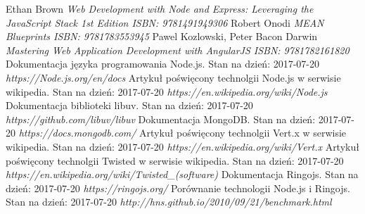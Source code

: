 \documentclass[12pt]{report}
\begin{document}
\begin{thebibliography}{99}
Ethan Brown
\textit{Web Development with Node and Express: Leveraging the JavaScript Stack 1st Edition ISBN: 9781491949306}
Robert Onodi
\textit{MEAN Blueprints ISBN: 9781783553945}
Pawel Kozlowski, Peter Bacon Darwin
\textit{Mastering Web Application Development with AngularJS ISBN: 9781782161820}
Dokumentacja języka programowania Node.js. Stan na dzień: 2017-07-20
\textit{https://Node.js.org/en/docs}
Artykuł poświęcony technolgii Node.js w serwisie wikipedia. Stan na dzień: 2017-07-20
\textit{https://en.wikipedia.org/wiki/Node.js}
Dokumentacja biblioteki libuv. Stan na dzień: 2017-07-20
\textit{https://github.com/libuv/libuv}
Dokumentacja MongoDB. Stan na dzień: 2017-07-20
\textit{https://docs.mongodb.com/}
Artykuł poświęcony technolgii Vert.x w serwisie wikipedia. Stan na dzień: 2017-07-20
\textit{https://en.wikipedia.org/wiki/Vert.x}
Artykuł poświęcony technolgii Twisted w serwisie wikipedia. Stan na dzień: 2017-07-20
\textit{https://en.wikipedia.org/wiki/Twisted\_(software)}
Dokumentacja Ringojs. Stan na dzień: 2017-07-20
\textit{https://ringojs.org/}
Porównanie technologii Node.js i Ringojs. Stan na dzień: 2017-07-20
\textit{http://hns.github.io/2010/09/21/benchmark.html}
\end{thebibliography}
\listoffigures
\end{document}
